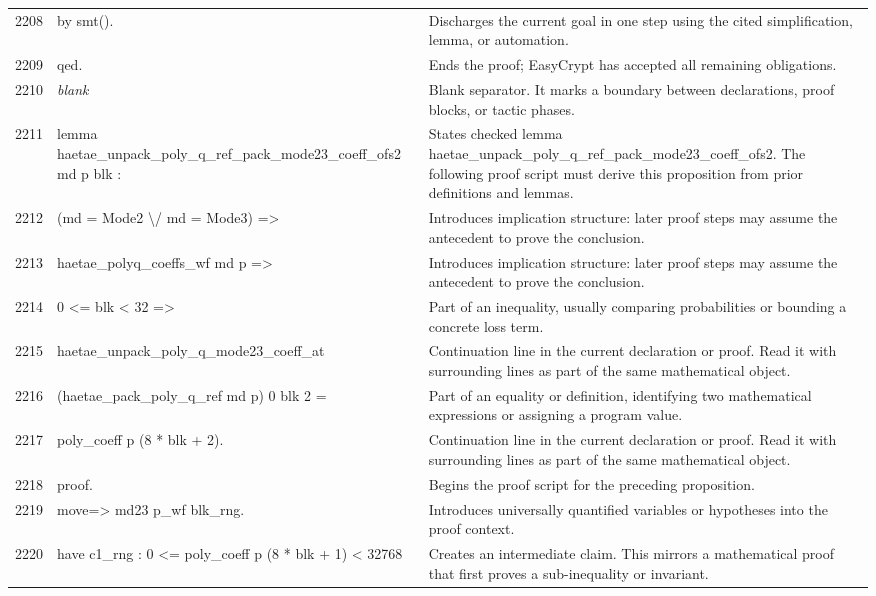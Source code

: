 \documentclass[10pt]{article}
\begin{document}
\begin{longtable}{r L{0.53\textwidth} L{0.37\textwidth}}
2208 & {\ttfamily\scriptsize by smt().} & Discharges the current goal in one step using the cited simplification, lemma, or automation. \\
2209 & {\ttfamily\scriptsize qed.} & Ends the proof; EasyCrypt has accepted all remaining obligations. \\
2210 & {\ttfamily\scriptsize \emph{blank}} & Blank separator.  It marks a boundary between declarations, proof blocks, or tactic phases. \\
2211 & {\ttfamily\scriptsize lemma haetae\_unpack\_poly\_q\_ref\_pack\_mode23\_coeff\_ofs2 md p blk :} & States checked lemma haetae\_unpack\_poly\_q\_ref\_pack\_mode23\_coeff\_ofs2.  The following proof script must derive this proposition from prior definitions and lemmas. \\
2212 & {\ttfamily\scriptsize   (md = Mode2 \textbackslash{}/ md = Mode3) =>} & Introduces implication structure: later proof steps may assume the antecedent to prove the conclusion. \\
2213 & {\ttfamily\scriptsize   haetae\_polyq\_coeffs\_wf md p =>} & Introduces implication structure: later proof steps may assume the antecedent to prove the conclusion. \\
2214 & {\ttfamily\scriptsize   0 <= blk < 32 =>} & Part of an inequality, usually comparing probabilities or bounding a concrete loss term. \\
2215 & {\ttfamily\scriptsize   haetae\_unpack\_poly\_q\_mode23\_coeff\_at} & Continuation line in the current declaration or proof.  Read it with surrounding lines as part of the same mathematical object. \\
2216 & {\ttfamily\scriptsize     (haetae\_pack\_poly\_q\_ref md p) 0 blk 2 =} & Part of an equality or definition, identifying two mathematical expressions or assigning a program value. \\
2217 & {\ttfamily\scriptsize   poly\_coeff p (8 * blk + 2).} & Continuation line in the current declaration or proof.  Read it with surrounding lines as part of the same mathematical object. \\
2218 & {\ttfamily\scriptsize proof.} & Begins the proof script for the preceding proposition. \\
2219 & {\ttfamily\scriptsize move=> md23 p\_wf blk\_rng.} & Introduces universally quantified variables or hypotheses into the proof context. \\
2220 & {\ttfamily\scriptsize have c1\_rng : 0 <= poly\_coeff p (8 * blk + 1) < 32768} & Creates an intermediate claim.  This mirrors a mathematical proof that first proves a sub-inequality or invariant. \\

\end{longtable}
\end{document}
